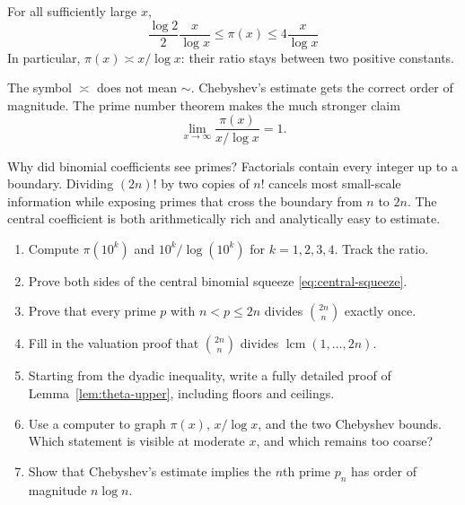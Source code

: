 \begin{theorem}
For all sufficiently large $x$,
\[
\boxed{
\frac{\log2}{2}\frac{x}{\log x}
\le \pi(x)\le
4\frac{x}{\log x}}
\]
In particular, $\pi(x)\asymp x/\log x$: their ratio stays between two positive constants.
\end{theorem}

\begin{warningbox}
The symbol $\asymp$ does not mean $\sim$. Chebyshev's estimate gets the correct order of magnitude. The prime number theorem makes the much stronger claim
\[
\lim_{x\to\infty}\frac{\pi(x)}{x/\log x}=1.
\]
\end{warningbox}

\begin{bigidea}
Why did binomial coefficients see primes? Factorials contain every integer up to a boundary. Dividing $(2n)!$ by two copies of $n!$ cancels most small-scale information while exposing primes that cross the boundary from $n$ to $2n$. The central coefficient is both arithmetically rich and analytically easy to estimate.
\end{bigidea}

\begin{exercisebox}
\begin{enumerate}
  \item Compute $\pi(10^k)$ and $10^k/\log(10^k)$ for $k=1,2,3,4$. Track the ratio. 
  \item Prove both sides of the central binomial squeeze \eqref{eq:central-squeeze}. 
  \item Prove that every prime $p$ with $n<p\le2n$ divides $\binom{2n}{n}$ exactly once. 
  \item Fill in the valuation proof that $\binom{2n}{n}$ divides $\operatorname{lcm}(1,\dots,2n)$. 
  \item Starting from the dyadic inequality, write a fully detailed proof of Lemma~\ref{lem:theta-upper}, including floors and ceilings. 
  \item Use a computer to graph $\pi(x)$, $x/\log x$, and the two Chebyshev bounds. Which statement is visible at moderate $x$, and which remains too coarse? 
  \item Show that Chebyshev's estimate implies the $n$th prime $p_n$ has order of magnitude $n\log n$. 
\end{enumerate}
\end{exercisebox}

